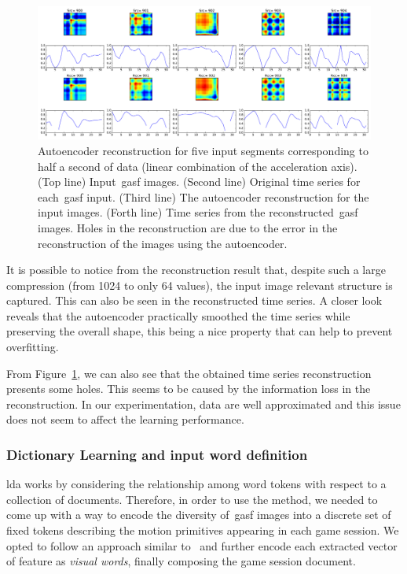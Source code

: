 \begin{figure}[h]
	\centering
	\includegraphics[width=\textwidth]{images/05-modeling/reconstructions}
	\caption{Autoencoder reconstruction for five input segments corresponding to half a second of data (linear combination of the acceleration axis). ({Top line}) Input~\gls{gasf} images. ({Second line}) Original time series for each~\gls{gasf} input. ({Third line}) The autoencoder reconstruction for the input images. ({Forth line}) Time series from the reconstructed~\gls{gasf} images. Holes in the reconstruction are due to the error in the reconstruction of the images using the autoencoder.}
  \label{fig:reconstruction}
\end{figure}

It is possible to notice from the reconstruction result that, despite such a large compression (from 1024 to only 64 values), the input image relevant structure is captured. This can also be seen in the reconstructed time series. A closer look reveals that the autoencoder practically smoothed the time series while preserving the overall shape, this being a nice property that can help to prevent overfitting.

From Figure~\ref{fig:reconstruction}, we can also see that the obtained time series reconstruction presents some holes. This seems to be caused by the information loss in the reconstruction. In our experimentation, data are well approximated and this issue does not seem to affect the learning performance.

\subsubsection{Dictionary Learning and input word definition}
\glsdesc{lda} works by considering the relationship among word tokens with respect to a collection of documents. Therefore, in order to use the method, we needed to come up with a way to encode the diversity of~\gls{gasf} images into a discrete set of fixed tokens describing the motion primitives appearing in each game session. We opted to follow an approach similar to~\cite{prince_computer_2012} and further encode each extracted vector of feature as \textit{visual words}, finally composing the game session document. 

